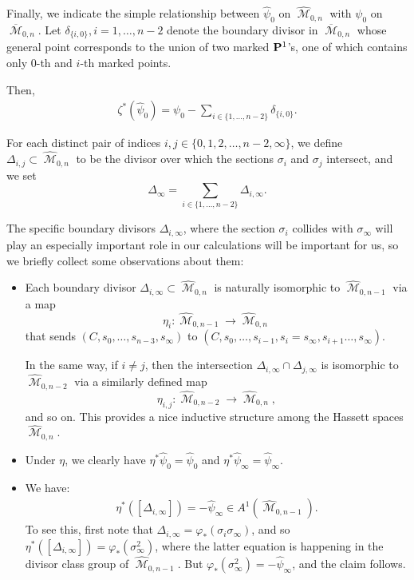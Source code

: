 \documentclass[12pt,reqno]{amsart}
\DeclareMathOperator{\M}{\mathcal{M}}
\renewcommand{\to}{{\longrightarrow}}
\numberwithin{equation}{section}
\newcommand{\hpsi}{\widehat{\psi}}
\newcommand{\hM}{\widehat{\M}}
\renewcommand {\o}[1]{\overline{#1}}
\begin{document}
Finally, we indicate the simple relationship between $\hpsi_{0}$ on
$\hM_{0,n}$ with $\psi_{0}$ on $\o{\M}_{0,n}$.  Let
$\delta_{\{i,0\}}, i=1, \dots, n-2$ denote the boundary divisor in
$\o{\M}_{0,n}$ whose general point corresponds to the union of two
marked $\P^{1}$'s, one of which contains only $0$-th and $i$-th marked
points.



Then,
\begin{align}
  \label{eq:relationpsis}
\zeta^{*}(\hpsi_{0}) = \psi_{0} - \sum_{i \in \{1, \dots, n-2\}} \delta_{\{i,0\}}.  
\end{align}













\begin{definition}
  \label{def:boundary}
  For each distinct pair of indices
  $i,j \in \{0, 1, 2, \dots, n-2, \infty \}$, we define
  $\Delta_{i,j} \subset \hM_{0,n}$ to be the divisor over which the
  sections $\sigma_{i}$ and $\sigma_{j}$ intersect, and we set
  $$\Delta_{\infty} = \sum_{i \in \{1, \dots, n-2 \}}
  \Delta_{i,\infty}.$$
\end{definition}

The specific boundary divisors $\Delta_{i, \infty}$, where the section
$\sigma_{i}$ collides with $\sigma_{\infty}$ will play an especially
important role in our calculations will be important for us, so we
briefly collect some observations about them:
\begin{itemize}\label{item:boundaryprops}
\item Each boundary divisor $\Delta_{i,\infty} \subset \hM_{0,n}$ is
  naturally isomorphic to $\hM_{0,n-1}$ via a map
  $$\eta_{i}: \hM_{0,n-1} \to \hM_{0,n}$$ that sends
  $(C, s_{0}, \dots, s_{n-3}, s_{\infty})$ to
  $(C, s_{0}, \dots, s_{i-1}, s_{i}=s_{\infty}, s_{i+1} \dots,
  s_{\infty})$.

  In the same way, if $i \neq j$, then the intersection
  $\Delta_{i,\infty} \cap \Delta_{j, \infty}$ is isomorphic to
  $\hM_{0,n-2}$ via a similarly defined map
  $$\eta_{i,j}: \hM_{0,n-2} \to \hM_{0,n},$$ and so on.  This provides a
  nice inductive structure among the Hassett spaces $\hM_{0,n}$.
  
\item Under $\eta$, we clearly have $\eta^{*}\hpsi_{0} = \hpsi_{0}$
  and $\eta^{*}\hpsi_{\infty} = \hpsi_{\infty}.$
\item We have:
\begin{align}\label{eq:pullbackdelta}
  \eta^{*}([\Delta_{i,\infty}]) = -\hpsi_{\infty} \in A^{1}(\hM_{0,n-1}).
\end{align}
To see this, first note that
$\Delta_{i, \infty} = \varphi_{*}(\sigma_{i}\sigma_{\infty})$, and so
$\eta^{*}([\Delta_{i,\infty}]) = \varphi_{*}(\sigma_{\infty}^{2})$,
where the latter equation is happening in the divisor class group of
$\hM_{0,n-1}$.  But
$\varphi_{*}(\sigma_{\infty}^{2}) = - \hpsi_{\infty}$, and the claim
follows.
\end{itemize}
\end{document}
